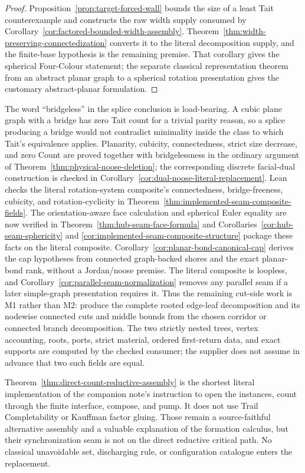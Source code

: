 \begin{proof}
Proposition~\ref{prop:target-forced-wall} bounds the size of a least Tait
counterexample and constructs the raw width supply consumed by
Corollary~\ref{cor:factored-bounded-width-assembly}.
Theorem~\ref{thm:width-preserving-connectedization} converts it to the
literal decomposition supply, and the finite-base hypothesis is the
remaining premise.  That corollary gives the spherical Four-Colour statement;
the separate classical representation theorem from an abstract planar graph
to a spherical rotation presentation gives the customary abstract-planar
formulation.
\end{proof}

The word ``bridgeless'' in the splice conclusion is load-bearing.  A cubic
plane graph with a bridge has zero Tait count for a trivial parity reason, so
a splice producing a bridge would not contradict minimality inside the class
to which Tait's equivalence applies.  Planarity, cubicity, connectedness,
strict size decrease, and zero Count are proved together with bridgelessness
in the ordinary argument of
Theorem~\ref{thm:physical-noose-deletion}; the corresponding discrete
facial-dual construction is checked in
Corollary~\ref{cor:dual-noose-literal-replacement}.  Lean checks the literal
rotation-system composite's connectedness, bridge-freeness, cubicity, and
rotation-cyclicity in
Theorem~\ref{thm:implemented-seam-composite-fields}.  The
orientation-aware face calculation and spherical Euler equality are now
verified in Theorem~\ref{thm:hub-seam-face-formula} and
Corollaries~\ref{cor:hub-seam-sphericity} and
\ref{cor:implemented-seam-composite-structure} package these facts on the
literal composite.  Corollary~\ref{cor:planar-bond-canonical-cap} derives
the cap hypotheses from connected graph-backed shores and the exact
planar-bond rank, without a Jordan/noose premise.  The literal
composite is loopless, and Corollary~\ref{cor:parallel-seam-normalization}
removes any parallel seam if a later simple-graph presentation requires it.
Thus the remaining cut-side work is M1 rather than M2: produce the complete
rooted edge-leaf decomposition and its nodewise connected cuts and middle
bounds from the chosen corridor or connected branch decomposition.  The two
strictly nested trees, vertex accounting, roots, ports, strict material,
ordered first-return data, and exact supports are computed by the checked
consumer; the supplier does not assume in advance that two such fields are
equal.

Theorem~\ref{thm:direct-count-reductive-assembly} is the shortest literal
implementation of the companion note's instruction to open the instances,
count through the finite interface, compose, and pump.  It does not use Trail
Completability or Kauffman factor gluing.  Those remain a source-faithful
alternative assembly and a valuable explanation of the formation calculus,
but their synchronization seam is not on the direct reductive critical path.
No classical unavoidable set, discharging rule, or configuration catalogue
enters the replacement.

